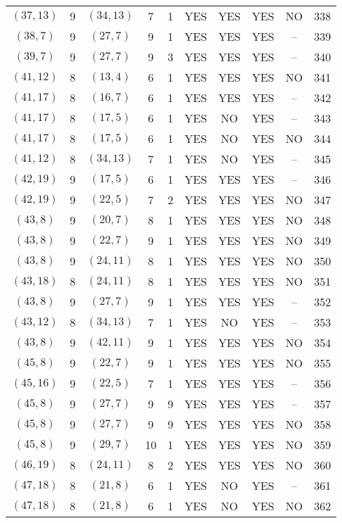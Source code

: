 \begin{longtable}{|c|c|c|c|c|c|c|c|c|c|}
$(37, 13)$ & 9 & $(34, 13)$ & 7 & 1 & YES & YES & YES & NO & 338\\
$(38, 7)$ & 9 & $(27, 7)$ & 9 & 1 & YES & YES & YES & -- & 339\\
$(39, 7)$ & 9 & $(27, 7)$ & 9 & 3 & YES & YES & YES & -- & 340\\
$(41, 12)$ & 8 & $(13, 4)$ & 6 & 1 & YES & YES & YES & NO & 341\\
$(41, 17)$ & 8 & $(16, 7)$ & 6 & 1 & YES & YES & YES & -- & 342\\
$(41, 17)$ & 8 & $(17, 5)$ & 6 & 1 & YES & NO & YES & -- & 343\\
$(41, 17)$ & 8 & $(17, 5)$ & 6 & 1 & YES & NO & YES & NO & 344\\
$(41, 12)$ & 8 & $(34, 13)$ & 7 & 1 & YES & NO & YES & -- & 345\\
$(42, 19)$ & 9 & $(17, 5)$ & 6 & 1 & YES & YES & YES & -- & 346\\
$(42, 19)$ & 9 & $(22, 5)$ & 7 & 2 & YES & YES & YES & NO & 347\\
$(43, 8)$ & 9 & $(20, 7)$ & 8 & 1 & YES & YES & YES & NO & 348\\
$(43, 8)$ & 9 & $(22, 7)$ & 9 & 1 & YES & YES & YES & NO & 349\\
$(43, 8)$ & 9 & $(24, 11)$ & 8 & 1 & YES & YES & YES & NO & 350\\
$(43, 18)$ & 8 & $(24, 11)$ & 8 & 1 & YES & YES & YES & NO & 351\\
$(43, 8)$ & 9 & $(27, 7)$ & 9 & 1 & YES & YES & YES & -- & 352\\
$(43, 12)$ & 8 & $(34, 13)$ & 7 & 1 & YES & NO & YES & -- & 353\\
$(43, 8)$ & 9 & $(42, 11)$ & 9 & 1 & YES & YES & YES & NO & 354\\
$(45, 8)$ & 9 & $(22, 7)$ & 9 & 1 & YES & YES & YES & NO & 355\\
$(45, 16)$ & 9 & $(22, 5)$ & 7 & 1 & YES & YES & YES & -- & 356\\
$(45, 8)$ & 9 & $(27, 7)$ & 9 & 9 & YES & YES & YES & -- & 357\\
$(45, 8)$ & 9 & $(27, 7)$ & 9 & 9 & YES & YES & YES & NO & 358\\
$(45, 8)$ & 9 & $(29, 7)$ & 10 & 1 & YES & YES & YES & NO & 359\\
$(46, 19)$ & 8 & $(24, 11)$ & 8 & 2 & YES & YES & YES & NO & 360\\
$(47, 18)$ & 8 & $(21, 8)$ & 6 & 1 & YES & NO & YES & -- & 361\\
$(47, 18)$ & 8 & $(21, 8)$ & 6 & 1 & YES & NO & YES & NO & 362\\

\end{longtable}
